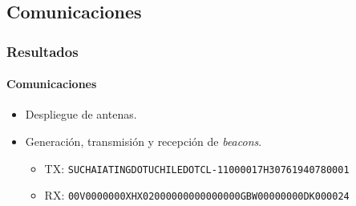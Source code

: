 \documentclass[xcolor=dvipsnames]{beamer}
\begin{document}
    \subsection{Comunicaciones}
    \begin{frame}[allowframebreaks]
        \frametitle{Resultados}
        \framesubtitle{Comunicaciones}
        
        \begin{itemize}
            \item Despliegue de antenas.
        \end{itemize}
        
        \begin{figure}[b]\centering
            \hspace{0.3cm}
        \end{figure}
        
        \newpage
        
        \begin{itemize}
            \item Generación, transmisión y recepción de \textit{beacons}.
            \begin{itemize}
                \item TX: \texttt{SUCHAIATINGDOTUCHILEDOTCL-11000017H30761940780001}
                \item RX: \texttt{00V0000000XHX02000000000000000GBW00000000DK000024}
            \end{itemize}
        \end{itemize}


\end{frame}
\end{document}
